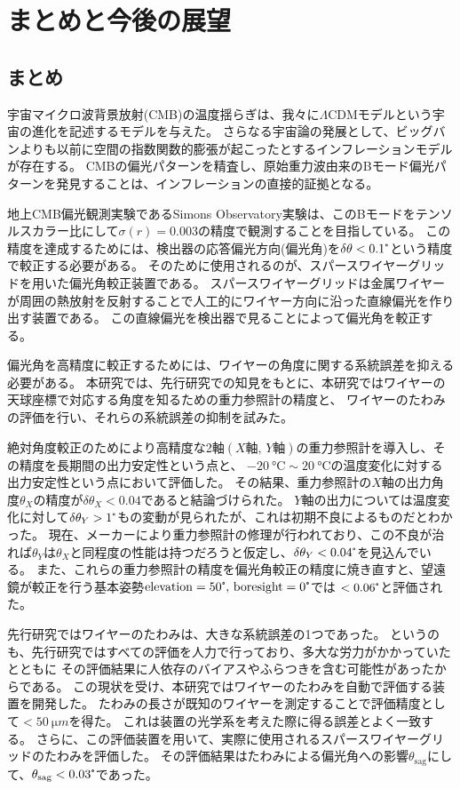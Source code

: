 \documentclass[../../main.tex]{subfiles}
\begin{document}
\chapter{まとめと今後の展望}
\section{まとめ}
宇宙マイクロ波背景放射(CMB)の温度揺らぎは、我々に$\Lambda \mathrm{CDM}$モデルという宇宙の進化を記述するモデルを与えた。
さらなる宇宙論の発展として、ビッグバンよりも以前に空間の指数関数的膨張が起こったとするインフレーションモデルが存在する。
CMBの偏光パターンを精査し、原始重力波由来のBモード偏光パターンを発見することは、インフレーションの直接的証拠となる。

地上CMB偏光観測実験であるSimons Observatory実験は、このBモードをテンソルスカラー比にして$\sigma(r)=0.003$の精度で観測することを目指している。
この精度を達成するためには、検出器の応答偏光方向(偏光角)を$\delta\theta<0.1\tcdegree$という精度で較正する必要がある。
そのために使用されるのが、スパースワイヤーグリッドを用いた偏光角較正装置である。
スパースワイヤーグリッドは金属ワイヤーが周囲の熱放射を反射することで人工的にワイヤー方向に沿った直線偏光を作り出す装置である。
この直線偏光を検出器で見ることによって偏光角を較正する。

偏光角を高精度に較正するためには、ワイヤーの角度に関する系統誤差を抑える必要がある。
本研究では、先行研究での知見をもとに、本研究ではワイヤーの天球座標で対応する角度を知るための重力参照計の精度と、
ワイヤーのたわみの評価を行い、それらの系統誤差の抑制を試みた。

絶対角度較正のためにより高精度な2軸$(X\text{軸},\,Y\text{軸})$の重力参照計を導入し、その精度を長期間の出力安定性という点と、
$\SI{-20}{\degreeCelsius}\sim\SI{20}{\degreeCelsius}$の温度変化に対する出力安定性という点において評価した。
その結果、重力参照計の$X$軸の出力角度$\theta_{X}$の精度が$\delta\theta_{X}<0.04$であると結論づけられた。
$Y$軸の出力については温度変化に対して$\delta\theta_{Y}>1\tcdegree$もの変動が見られたが、これは初期不良によるものだとわかった。
現在、メーカーにより重力参照計の修理が行われており、この不良が治れば$\theta_{Y}$は$\theta_{X}$と同程度の性能は持つだろうと仮定し、$\delta\theta_{Y}<0.04\tcdegree$を見込んでいる。
また、これらの重力参照計の精度を偏光角較正の精度に焼き直すと、望遠鏡が較正を行う基本姿勢$\mathrm{elevation}=50\tcdegree,\,\mathrm{boresight}=0\tcdegree$では
$<0.06\tcdegree$と評価された。

先行研究ではワイヤーのたわみは、大きな系統誤差の1つであった。
というのも、先行研究ではすべての評価を人力で行っており、多大な労力がかかっていたとともに
その評価結果に人依存のバイアスやふらつきを含む可能性があったからである。
この現状を受け、本研究ではワイヤーのたわみを自動で評価する装置を開発した。
たわみの長さが既知のワイヤーを測定することで評価精度として$<\SI{50}{\micro m}$を得た。
これは装置の光学系を考えた際に得る誤差とよく一致する。
さらに、この評価装置を用いて、実際に使用されるスパースワイヤーグリッドのたわみを評価した。
その評価結果はたわみによる偏光角への影響$\theta_{\mathrm{sag}}$にして、$\theta_{\mathrm{sag}}<0.03\tcdegree$であった。
\end{document}
